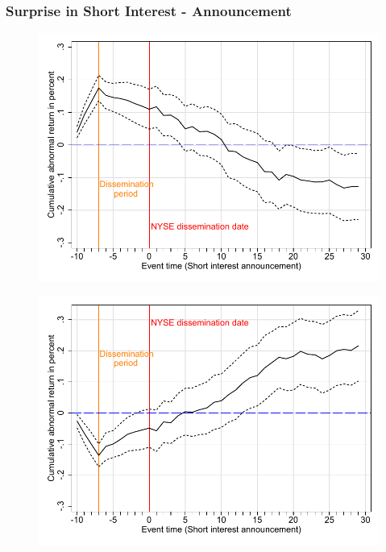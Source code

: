 \documentclass{beamer}
\begin{document}
\begin{frame}
		\frametitle{Surprise in Short Interest - Announcement}
		\vspace*{-0.3cm}
\begin{figure}[htbp]
	 \centering
	\includegraphics[scale=0.39]{figures/Event_study_High_dec_susir.pdf} 
\end{figure}
\vspace*{-0.9cm}
\begin{figure}[htbp]
	 \centering
	\includegraphics[scale=0.39]{figures/Event_study_Low_dec_susir.pdf} \\

\end{figure}
\end{frame}
\end{document}
